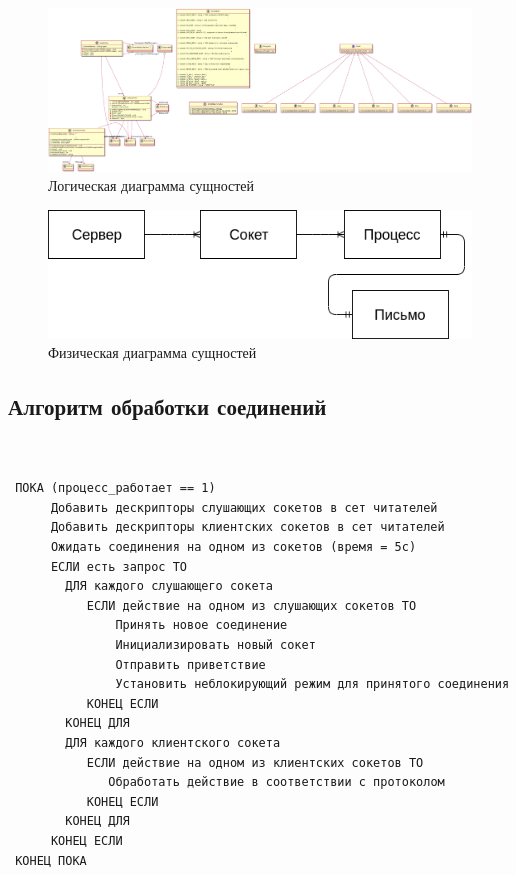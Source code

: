 \documentclass[a4paper,12pt]{report}
\begin{document}
\begin{figure}
\centering
\includegraphics[width=\textwidth]{static/Server_Class_Diagram.png}
\caption{Логическая диаграмма сущностей}
\label{fig:logic_diagram}
\end{figure}

\begin{figure}
\centering
\includegraphics[width=\textwidth]{static/physical.png}
\caption{Физическая диаграмма сущностей}
\label{fig:phys_diagram}
\end{figure}

\subsection{Алгоритм обработки соединений}
\begin{verbatim}


 ПОКА (процесс_работает == 1) 
      Добавить дескрипторы слушающих сокетов в сет читателей 
      Добавить дескрипторы клиентских сокетов в сет читателей 
      Ожидать соединения на одном из сокетов (время = 5с) 
      ЕСЛИ есть запрос ТО 
        ДЛЯ каждого слушающего сокета 
           ЕСЛИ действие на одном из слушающих сокетов ТО 
               Принять новое соединение 
               Инициализировать новый сокет 
               Отправить приветствие 
               Установить неблокирующий режим для принятого соединения 
           КОНЕЦ ЕСЛИ 
        КОНЕЦ ДЛЯ 
        ДЛЯ каждого клиентского сокета 
           ЕСЛИ действие на одном из клиентских сокетов ТО 
              Обработать действие в соответствии с протоколом 
           КОНЕЦ ЕСЛИ 
        КОНЕЦ ДЛЯ 
      КОНЕЦ ЕСЛИ 
 КОНЕЦ ПОКА 

\end{verbatim}
\end{document}
